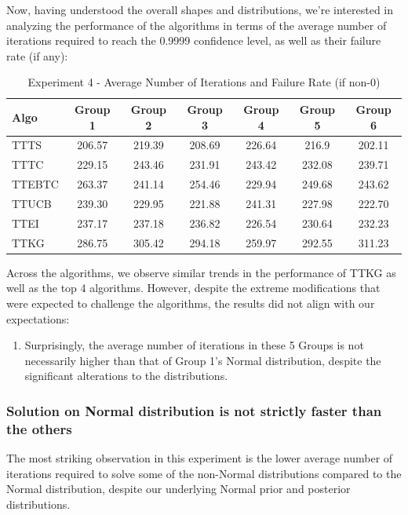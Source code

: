 \documentclass[a4paper, 12pt]{article}
\theoremstyle{definition}
\begin{document}
Now, having understood the overall shapes and distributions, we're interested in analyzing the performance of the algorithms in terms of the average number of iterations required to reach the 0.9999 confidence level, as well as their failure rate (if any):

\begin{table}[hbt!]
\centering
\begin{tabular}{lcccccc}
\hline
Algo & Group 1 & Group 2 & Group 3 & Group 4 & Group 5 & Group 6 \\
\hline
TTTS & 206.57 & 219.39 & 208.69 & 226.64 & 216.9 & 202.11 \\
TTTC & 229.15 & 243.46 & 231.91 & 243.42 & 232.08 & 239.71 \\
TTEBTC & 263.37 & 241.14 & 254.46 & 229.94 & 249.68 & 243.62 \\
TTUCB & 239.30 & 229.95 & 221.88 & 241.31 & 227.98 & 222.70 \\
TTEI & 237.17 & 237.18 & 236.82 & 226.54 & 230.64 & 232.23 \\
TTKG & 286.75 & 305.42 & 294.18 & 259.97 & 292.55 & 311.23 \\
\hline
\end{tabular}
\caption{Experiment 4 - Average Number of Iterations and Failure Rate (if non-0)}
\label{table:exp4_iter}
\end{table}

Across the algorithms, we observe similar trends in the performance of TTKG as well as the top 4 algorithms. However, despite the extreme modifications that were expected to challenge the algorithms, the results did not align with our expectations:

\begin{enumerate}
    \item Surprisingly, the average number of iterations in these 5 Groups is not necessarily higher than that of Group 1's Normal distribution, despite the significant alterations to the distributions.
\end{enumerate}

\subsubsection{Solution on Normal distribution is not strictly faster than the others}
The most striking observation in this experiment is the lower average number of iterations required to solve some of the non-Normal distributions compared to the Normal distribution, despite our underlying Normal prior and posterior distributions.
\end{document}
